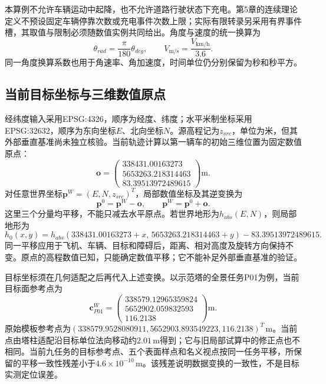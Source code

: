 本算例不允许车辆运动中起降，也不允许道路行驶状态下充电。第5章的连续理论定义不预设固定车辆停靠次数或充电事件次数上限；实际有限转录另采用有界事件槽，其取值与限制必须随数值实例共同给出。角度与速度的统一换算为
\begin{equation}
 \theta_{rad}=\frac{\pi}{180}\theta_{deg},
 \qquad
 V_{\mathrm{m/s}}=\frac{V_{\mathrm{km/h}}}{3.6}.
 \label{s0601:angle_speed_conversion}
\end{equation}
同一角度换算系数也用于角速率、角加速度，时间单位仍分别保留为秒和秒平方。

\subsection{当前目标坐标与三维数值原点}

经纬度输入采用EPSG:4326，顺序为经度、纬度；水平米制坐标采用EPSG:32632，顺序为东向坐标$E$、北向坐标$N$。源高程记为$z_{src}$，单位为米，但其外部垂直基准尚未独立核验。当前轨迹计算以第一辆车的初始三维位置为固定数值原点：
\begin{equation}
 \mathbf o=
 \begin{pmatrix}
 338431.00163273\\
 5653263.218314463\\
 83.39513972489615
 \end{pmatrix}\mathrm m.
 \label{s0601:numeric_origin}
\end{equation}
对任意世界坐标$\mathbf p^W=(E,N,z_{src})^T$，局部数值坐标及其逆变换为
\begin{equation}
 \mathbf p^0=\mathbf p^W-\mathbf o,
 \qquad
 \mathbf p^W=\mathbf p^0+\mathbf o.
 \label{s0601:coordinate_conversion}
\end{equation}
这里三个分量均平移，不能只减去水平原点。若世界地形为$h_{abs}(E,N)$，则局部地形为
\begin{equation}
 h_0(x,y)=h_{abs}(338431.00163273+x,\,
 5653263.218314463+y)-83.39513972489615.
 \label{s0601:local_numeric_terrain}
\end{equation}
同一平移应用于飞机、车辆、目标和障碍后，距离、相对高度及旋转方向保持不变。原点的高程数值已知，只能确定数值平移；它不能补足外部垂直基准的验证。

目标坐标须在几何适配之后再代入上述变换。以示范塔的全景任务P01为例，当前目标面参考点为
\begin{equation}
 \mathbf c_{P01}^{W}=
 \begin{pmatrix}
 338579.12965359824\\
 5652902.059832593\\
 116.2138
 \end{pmatrix}\mathrm m.
 \label{s0601:current_target_center}
\end{equation}
原始模板参考点为$(338579.9528080911,5652903.893549223,116.2138)^T\,\mathrm m$。当前点由塔柱适配沿目标单位法向移动约$2.01\,\mathrm m$得到；它与旧局部试算中的修正点也不相同。当前九任务的目标参考点、五个表面样点和名义视点按同一任务平移，所保留的平移一致性残差小于$4.6\times10^{-10}\,\mathrm m$。该残差说明数据变换的一致性，不是目标实测定位误差。

